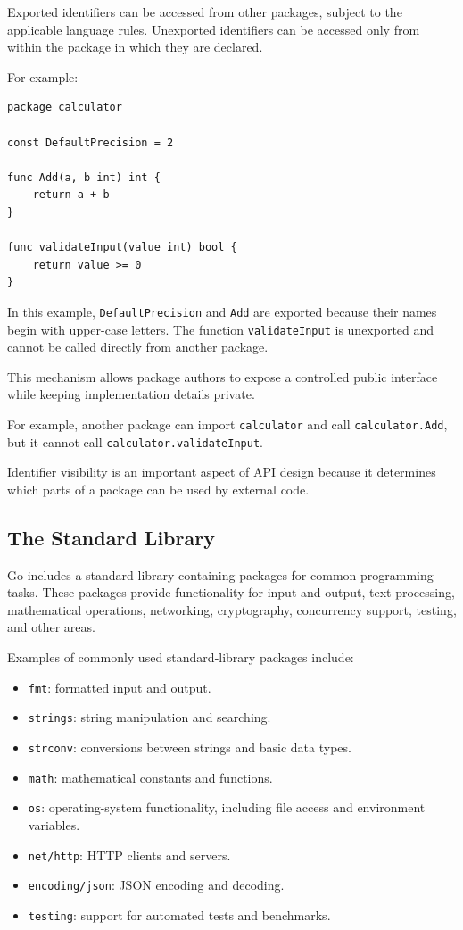 Exported identifiers can be accessed from other packages, subject to the applicable language rules. Unexported identifiers can be accessed only from within the package in which they are declared.

For example:

\begin{lstlisting}
package calculator

const DefaultPrecision = 2

func Add(a, b int) int {
    return a + b
}

func validateInput(value int) bool {
    return value >= 0
}
\end{lstlisting}

In this example, \texttt{DefaultPrecision} and \texttt{Add} are exported because their names begin with upper-case letters. The function \texttt{validateInput} is unexported and cannot be called directly from another package.

This mechanism allows package authors to expose a controlled public interface while keeping implementation details private.

For example, another package can import \texttt{calculator} and call \texttt{calculator.Add}, but it cannot call \texttt{calculator.validateInput}.

Identifier visibility is an important aspect of API design because it determines which parts of a package can be used by external code.

\subsection{The Standard Library}

Go includes a standard library containing packages for common programming tasks. These packages provide functionality for input and output, text processing, mathematical operations, networking, cryptography, concurrency support, testing, and other areas.

Examples of commonly used standard-library packages include:

\begin{itemize}
    \item \texttt{fmt}: formatted input and output.
    \item \texttt{strings}: string manipulation and searching.
    \item \texttt{strconv}: conversions between strings and basic data types.
    \item \texttt{math}: mathematical constants and functions.
    \item \texttt{os}: operating-system functionality, including file access and environment variables.
    \item \texttt{net/http}: HTTP clients and servers.
    \item \texttt{encoding/json}: JSON encoding and decoding.
    \item \texttt{testing}: support for automated tests and benchmarks.
\end{itemize}


